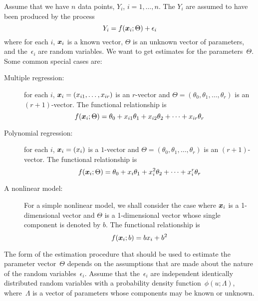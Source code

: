 \documentclass{admbmanual}
\begin{document}
Assume that we have $n$ data points, $Y_i$, $i=1,\ldots,n$. 
The $Y_i$ are assumed to have been produced by the process
\begin{equation}\label{eq:robust-nonlinear-regression-00}%
  Y_i=f({\mbox{\boldmath $x$}}_i;\Theta)+\epsilon_i
\end{equation}
where for each $i$, ${\mbox{\boldmath $x$}}_i$ is a known vector, $\Theta$
is an unknown vector of parameters, and the~$\epsilon_i$ are
random variables. We want to get estimates for the
parameters~$\Theta$. Some common special cases are:
\begin{description}

\item[Multiple regression:]
for each $i$,
${\mbox{\boldmath $x$}}_i =(x_{i1},\ldots,x_{ir})$ is an $r$-vector and
$\Theta =(\theta_{0},\theta_{1},\ldots,\theta_{r})$ is an $(r+1)$-vector. The
functional relationship is
\begin{equation*}
  f({\mbox{\boldmath $x$}}_i;\Theta)=\theta_0+x_{i1}\theta_1+x_{i2}\theta_2+\cdots+x_{ir}\theta_r
\end{equation*}

\item[Polynomial regression:]
for each $i$, ${\mbox{\boldmath $x$}}_i =(x_i)$  is a $1$-vector and
$\Theta =(\theta_{0},\theta_{1},\ldots,\theta_{r})$ is an $(r+1)$-vector. The
functional relationship is
\begin{equation*}
  f({\mbox{\boldmath $x$}}_i;\Theta)=\theta_0+x_i\theta_1+x_i^2\theta_2+\cdots+x_i^r\theta_r
\end{equation*}

\item[A nonlinear model:]
For  a simple nonlinear model, we shall consider the case where ${\mbox{\boldmath $x$}}_i$
is a 1-dimensional vector and $\Theta$ is a 1-dimensional vector
whose single component is denoted by $b$. The functional
relationship is 
\begin{equation}\label{eq:robust-nonlinear-regression-01} %
  f({\mbox{\boldmath $x$}}_i;b)=bx_i+b^2
\end{equation}
\end{description}

The form of the estimation procedure that should be
used to estimate the parameter 
vector~$\Theta$ depends on the assumptions that are made about
the nature of the random variables~$\epsilon_i$. Assume that the~$\epsilon_i$ 
are independent identically distributed random variables
with a probability density function~$\phi(u;\Lambda)$, where~$\Lambda$
is a vector of parameters whose components may be known or unknown. 
\end{document}
